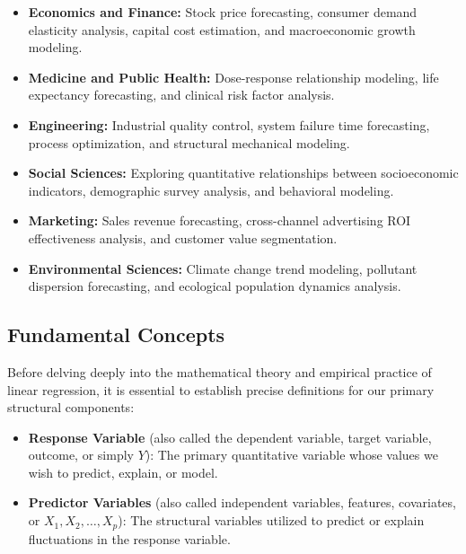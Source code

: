 \begin{itemize}
	\item \textbf{Economics and Finance:} Stock price forecasting, consumer demand elasticity analysis, capital cost estimation, and macroeconomic growth modeling.
	\item \textbf{Medicine and Public Health:} Dose-response relationship modeling, life expectancy forecasting, and clinical risk factor analysis.
	\item \textbf{Engineering:} Industrial quality control, system failure time forecasting, process optimization, and structural mechanical modeling.
	\item \textbf{Social Sciences:} Exploring quantitative relationships between socioeconomic indicators, demographic survey analysis, and behavioral modeling.
	\item \textbf{Marketing:} Sales revenue forecasting, cross-channel advertising ROI effectiveness analysis, and customer value segmentation.
	\item \textbf{Environmental Sciences:} Climate change trend modeling, pollutant dispersion forecasting, and ecological population dynamics analysis.
\end{itemize}

\subsection{Fundamental Concepts}

Before delving deeply into the mathematical theory and empirical practice of linear regression, it is essential to establish precise definitions for our primary structural components:

\begin{definicion}
	\begin{itemize}
		\item \textbf{Response Variable} (also called the dependent variable, target variable, outcome, or simply $Y$): The primary quantitative variable whose values we wish to predict, explain, or model.
		\item \textbf{Predictor Variables} (also called independent variables, features, covariates, or $X_1, X_2, \ldots, X_p$): The structural variables utilized to predict or explain fluctuations in the response variable.
	\end{itemize}
\end{definicion}

